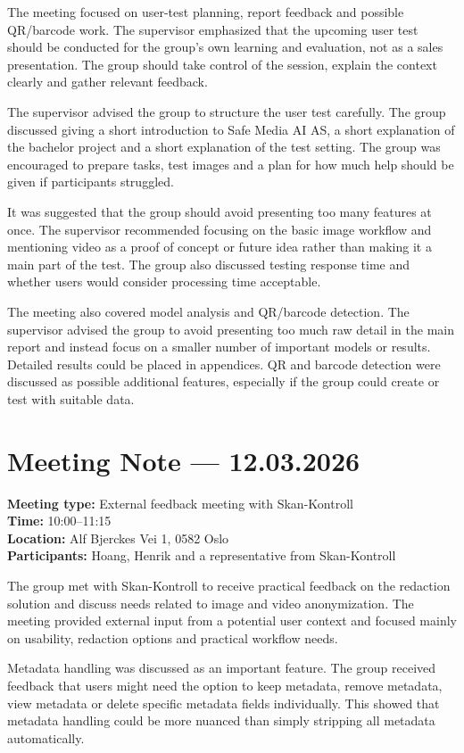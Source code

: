 The meeting focused on user-test planning, report feedback and possible QR/barcode work. The supervisor emphasized that the upcoming user test should be conducted for the group's own learning and evaluation, not as a sales presentation. The group should take control of the session, explain the context clearly and gather relevant feedback.

The supervisor advised the group to structure the user test carefully. The group discussed giving a short introduction to Safe Media AI AS, a short explanation of the bachelor project and a short explanation of the test setting. The group was encouraged to prepare tasks, test images and a plan for how much help should be given if participants struggled.

It was suggested that the group should avoid presenting too many features at once. The supervisor recommended focusing on the basic image workflow and mentioning video as a proof of concept or future idea rather than making it a main part of the test. The group also discussed testing response time and whether users would consider processing time acceptable.

The meeting also covered model analysis and QR/barcode detection. The supervisor advised the group to avoid presenting too much raw detail in the main report and instead focus on a smaller number of important models or results. Detailed results could be placed in appendices. QR and barcode detection were discussed as possible additional features, especially if the group could create or test with suitable data.

\section{Meeting Note --- 12.03.2026}
\label{app:meeting-2026-03-12}
\textbf{Meeting type:} External feedback meeting with Skan-Kontroll\\
\textbf{Time:} 10:00--11:15\\
\textbf{Location:} Alf Bjerckes Vei 1, 0582 Oslo\\
\textbf{Participants:} Hoang, Henrik and a representative from Skan-Kontroll

The group met with Skan-Kontroll to receive practical feedback on the redaction solution and discuss needs related to image and video anonymization. The meeting provided external input from a potential user context and focused mainly on usability, redaction options and practical workflow needs.

Metadata handling was discussed as an important feature. The group received feedback that users might need the option to keep metadata, remove metadata, view metadata or delete specific metadata fields individually. This showed that metadata handling could be more nuanced than simply stripping all metadata automatically.

